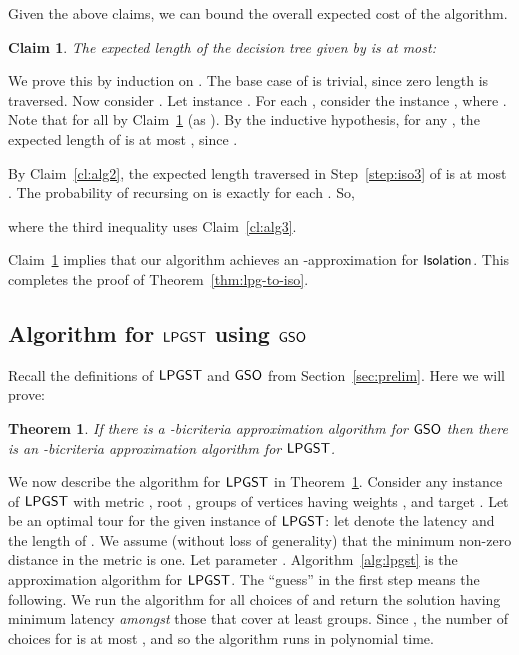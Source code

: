 \documentclass[11pt]{article}
\newtheorem{theorem}[thm]{Theorem}
\newtheorem{claim}[thm]{Claim}
\def\isoprob{\ensuremath{{\sf Isolation}}\xspace}
\def\lpgst{\ensuremath{{\sf LPGST}}\xspace}
\def\gso{\ensuremath{{\sf GSO}}\xspace}
\newenvironment{pf}{

\noindent{\bf Proof:}} {\hfill


}
\begin{document}
Given the above claims, we can bound the overall expected cost of the algorithm.
\begin{claim}
  \label{cl:alg4}
  The expected length of the  decision tree  given by  is at most:
  
\end{claim}
\begin{pf}
We prove this by induction on . The base case of  is  trivial, since zero length is traversed. Now
consider . Let instance . For each , consider the
 instance , where . Note that  for all  by Claim~\ref{cl:alg4} (as ). By the inductive hypothesis, for any , the
  expected length of  is at most , since .

  By Claim~\ref{cl:alg2}, the expected length traversed in
  Step~\ref{step:iso3} of  is at most . The probability of recursing on  is exactly
   for each . So, 
    
where the third inequality uses Claim~\ref{cl:alg3}.
\end{pf}

Claim~\ref{cl:alg4} implies that our algorithm achieves  an -approximation 
  for \isoprob. This  completes the proof of Theorem~\ref{thm:lpg-to-iso}.






\subsection{Algorithm for \lpgst using \gso}
\label{subsec:grp-lat}

Recall the definitions of \lpgst and \gso from Section~\ref{sec:prelim}. Here we will prove:
\begin{theorem}\label{thm:lpgs}
If there is a -bicriteria approximation algorithm for \gso then there is an -bicriteria approximation algorithm for \lpgst.
\end{theorem}






We now describe the  algorithm for \lpgst in Theorem~\ref{thm:lpgs}.  Consider any instance of \lpgst with metric
, root ,  groups of vertices  having weights ,  and
target . Let  be an optimal tour for the given instance of \lpgst: let  denote the
latency and  the length of . We assume (without loss of generality) that the minimum non-zero distance in the metric is one. Let parameter .
 Algorithm~\ref{alg:lpgst} is the
approximation algorithm for \lpgst.
The ``guess'' in the first step means the following. We run the algorithm for all choices of  and return the
solution having minimum latency {\em amongst} those that cover at least  groups. Since , the number of choices for  is at most , and so the algorithm runs in polynomial time. 
\end{document}
